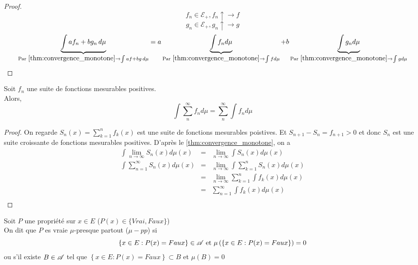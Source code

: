 \begin{proof}
	$$f_n \in \mathcal{E}_+, f_n \uparrow \to f$$
	$$ g_n \in \mathcal{E}_+, g_n \uparrow \to g$$
	$$ \underbrace{\int a f_n + b g_n \,d\mu}_{\text{Par } \ref{thm:convergence_monotone} \to \int a f + b g\,d\mu}
		= a \underbrace{\int f_n d\mu}_{ \text{Par } \ref{thm:convergence_monotone} \to \int f d\mu}
		+ b \underbrace{\int g_n d\mu}_{ \text{Par } \ref{thm:convergence_monotone} \to \int g d\mu} $$
\end{proof}



\begin{prop} 
	Soit $f_n$ une suite de fonctions mesurables positives.\\
	Alors,
	$$ \int \sum\limits_n^{\infty} f_n d\mu = \sum\limits_n^{\infty} \int f_n d\mu $$
\end{prop}

\begin{proof}
	On regarde $S_n(x) = \sum\limits_{k=1}^n f_k(x)$ est une suite de fonctions mesurables poistives.
	Et $S_{n+1} - S_n = f_{n+1} > 0 $ et donc $S_n$ est une suite croissante de fonctions mesurables positives.
	D'après le \ref{thm:convergence_monotone}, on a
	\begin{eqnarray*}
		\int \lim\limits_{n \to \infty} S_n (x)d\mu (x)&=& \lim\limits_{n \to \infty} \int S_n(x) d\mu(x) \\
		\int \sum\limits_{n = 1}^{\infty} S_n (x)d\mu (x)&=& \lim\limits_{n \to \infty} \int \sum\limits_{k = 1}^n S_n(x) d\mu(x) \\
		&=& \lim\limits_{n \to \infty} \sum\limits_{k = 1}^n\int  f_k(x) d\mu(x) \\
		&=& \sum\limits_{n = 1}^{\infty} \int  f_k(x) d\mu(x) \\
	\end{eqnarray*}
\end{proof}


\begin{definition}
	Soit $P$ une propriété sur $x \in E$ ($P(x) \in \{Vrai, Faux\}$)\\
	On dit que $P$ es vraie $\mu$-presque partout ($\mu-pp$) si
	$$ \left\{x \in E : P(x)  = Faux \right\} \in \mathscr{A} \text{ et } \mu\left(\left\{x \in E : P(x)  = Faux \right\}\right) = 0 $$
	ou s'il existe $B \in \mathscr{A}$ tel que $\left\{ x \in E : P(x) = Faux \right\} \subset B$ et $\mu(B) = 0$
\end{definition}

